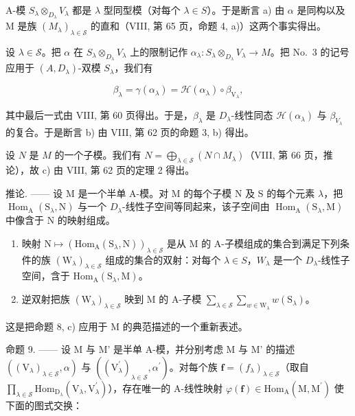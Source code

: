 A-模 \(S_{\lambda} \otimes_{D_{\lambda}} V_{\lambda}\) 都是 \(\lambda\) 型同型模（对每个 \(\lambda \in S\)）。于是断言 a) 由 \(\alpha\) 是同构以及 M 是族 \((M_{\lambda})_{\lambda \in \mathcal{S}}\) 的直和（VIII, 第 65 页，命题 4, a)）这两个事实得出。

设 \(\lambda \in \mathcal{S}\)。把 \(\alpha\) 在 \(S_{\lambda} \otimes_{D_{\lambda}} V_{\lambda}\) 上的限制记作 \(\alpha_{\lambda}: S_{\lambda} \otimes_{D_{\lambda}} V_{\lambda} \to M\)。把 No.~3 的记号应用于 \((A, D_{\lambda})\)-双模 \(S_{\lambda}\)，我们有

\[
\beta_ {\lambda} = \gamma (\alpha_ {\lambda}) = \mathcal {H} (\alpha_ {\lambda}) \circ \beta_ {\mathrm{V} _ {\lambda}},
\]

其中最后一式由 VIII, 第 60 页得出。于是，\(\beta_{\lambda}\) 是 \(D_{\lambda}\)-线性同态 \(\mathcal{H}(\alpha_{\lambda})\) 与 \(\beta_{V_{\lambda}}\) 的复合。于是断言 b) 由 VIII, 第 62 页的命题 3, b) 得出。

设 \(N\) 是 \(M\) 的一个子模。我们有 \(N = \bigoplus_{\lambda \in \mathcal{S}} (N \cap M_{\lambda})\)（VIII, 第 66 页，推论），故 c) 由 VIII, 第 62 页的定理 2 得出。

推论. —— 设 M 是一个半单 A-模。对 M 的每个子模 N 及 S 的每个元素 \(\lambda\)，把 \(\operatorname{Hom}_{\mathrm{A}}(\mathrm{S}_{\lambda},\mathrm{N})\) 与一个 \(D_{\lambda}\)-线性子空间等同起来，该子空间由 \(\operatorname{Hom}_{\mathrm{A}}(\mathrm{S}_{\lambda},\mathrm{M})\) 中像含于 N 的映射组成。

\begin{enumerate}
\def\labelenumi{\alph{enumi})}
\item
  映射 \(\mathrm{N}\mapsto(\mathrm{Hom}_{\mathrm{A}}(\mathrm{S}_{\lambda},\mathrm{N}))_{\lambda\in\mathcal{S}}\) 是从 M 的 A-子模组成的集合到满足下列条件的族 \((\mathrm{W}_{\lambda})_{\lambda\in\mathcal{S}}\) 组成的集合的双射：对每个 \(\lambda\in S\)，\(W_{\lambda}\) 是一个 \(D_{\lambda}\)-线性子空间，含于 \(\mathrm{Hom}_{\mathrm{A}}(\mathrm{S}_{\lambda},\mathrm{M})\)。
\item
  逆双射把族 \((\mathrm{W}_{\lambda})_{\lambda \in \mathcal{S}}\) 映到 M 的 A-子模 \(\sum_{\lambda \in \mathcal{S}}\sum_{w\in \mathrm{W}_{\lambda}}w(\mathrm{S}_{\lambda})\)。
\end{enumerate}

这是把命题 8, c) 应用于 M 的典范描述的一个重新表述。

命题 9. —— 设 M 与 M' 是半单 A-模，并分别考虑 M 与 M' 的描述 \(((\mathrm{V}_{\lambda})_{\lambda\in\mathcal{S}},\alpha)\) 与 \(((\mathrm{V}_{\lambda}^{\prime})_{\lambda\in\mathcal{S}},\alpha^{\prime})\)。对每个族 \(\boldsymbol{f}=(f_{\lambda})_{\lambda\in\mathcal{S}}\)（取自 \(\prod_{\lambda\in\mathcal{S}}\mathrm{Hom}_{\mathrm{D}_{\lambda}}(\mathrm{V}_{\lambda},\mathrm{V}_{\lambda}^{\prime})\)），存在唯一的 A-线性映射 \(\varphi(\boldsymbol{f})\in\mathrm{Hom}_{\mathrm{A}}(\mathrm{M},\mathrm{M}^{\prime})\) 使下面的图式交换：

